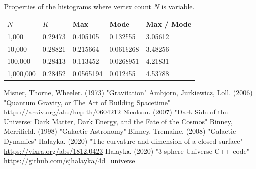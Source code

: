 \documentclass[12pt]{article}
\begin{document}
\begin{table}
\centering
\begin{tabular}{|l|l|l|l|l|}
\hline
$N$ & $K$ & Max & Mode & Max / Mode  \\ 
\hline
\hline
1,000
& 
0.29473
& 
0.405105
&
0.132555
&
3.05612
\\
\hline
10,000
& 
0.28821
& 
0.215664
&
0.0619268
&
3.48256
\\
\hline
100,000
& 
0.28413
& 
0.113452
&
0.0268951
&
4.21831
\\

\hline
1,000,000
& 
0.28452
& 
0.0565194
&
0.012455
&
4.53788
\\


\hline



\end{tabular}
\caption{Properties of the histograms where vertex count $N$ is variable.}
\end{table} 




\begin{thebibliography}{9}
 Misner, Thorne, Wheeler. (1973) "Gravitation"
 Ambjorn, Jurkiewicz, Loll. (2006) "Quantum Gravity, or The Art of Building Spacetime" \\ \url{https://arxiv.org/abs/hep-th/0604212}
 Nicolson. (2007) "Dark Side of the Universe: Dark Matter, Dark Energy, and the Fate of the Cosmos"
 Binney, Merrifield. (1998) "Galactic Astronomy"
 Binney, Tremaine. (2008) "Galactic Dynamics"
 Halayka. (2020) "The curvature and dimension of a closed surface" \\ \url{https://vixra.org/abs/1812.0423}
 Halayka. (2020) "3-sphere Universe C++ code" \\  \url{https://github.com/sjhalayka/4d_universe}

\end{thebibliography}
\end{document}
